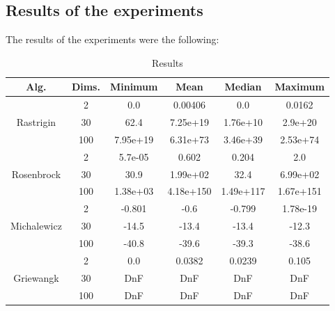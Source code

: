 \documentclass[conference]{IEEEtran}
\begin{document}
\subsection{Results of the experiments}
The results of the experiments were the following:

\begin{table}[!htbp]
    \caption{Results}
    \centering
    \begin{tabular}{|c c|c c c c|}
        \hline
        Alg. & Dims. & Minimum & Mean & Median & Maximum \\
        \hline
        \multirow{3}{*}{Rastrigin} & 2 & 0.0 & 0.00406 & 0.0 & 0.0162 \\
        & 30 & 62.4 & 7.25e+19 & 1.76e+10 & 2.9e+20 \\
        & 100 & 7.95e+19 & 6.31e+73 & 3.46e+39 & 2.53e+74 \\
        \hline
        \multirow{3}{*}{Rosenbrock} & 2 & 5.7e-05 & 0.602 & 0.204 & 2.0 \\
        & 30 & 30.9 & 1.99e+02 & 32.4 & 6.99e+02 \\
        & 100 & 1.38e+03 & 4.18e+150 & 1.49e+117 & 1.67e+151 \\
        \hline
        \multirow{3}{*}{Michalewicz} & 2 & -0.801 & -0.6 & -0.799 & 1.78e-19 \\
        & 30 & -14.5 & -13.4 & -13.4 & -12.3 \\
        & 100 & -40.8 & -39.6 & -39.3 & -38.6 \\
        \hline
        \multirow{3}{*}{Griewangk} & 2 & 0.0 & 0.0382 & 0.0239 & 0.105 \\
        & 30 & DnF & DnF & DnF & DnF \\
        & 100 & DnF & DnF & DnF & DnF \\
        \hline
    \end{tabular}
\end{table}
\end{document}
